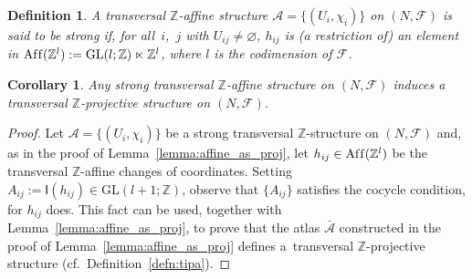 \documentclass[10pt,a4paper]{amsart}
\numberwithin{equation}{section}
\newtheorem{Corollary}[Theorem]{Corollary}
\newtheorem{Definition}[Theorem]{Definition}
\newcommand{\ZZ}{\mathbb{Z}}
\begin{document}
\begin{Definition}\label{defn:strong_Z_aff}
A transversal $\ZZ$-af\/f\/ine structure $\mathcal{A}=\{(U_i,\chi_i)\}$ on $(N,\mathcal{F})$ is said to be {\it strong} if, for all~$i$,~$j$ with $U_{ij} \neq \varnothing$, $h_{ij}$ is (a restriction of) an element in $\operatorname{Af\/f}(\ZZ^l):= \mathrm{GL}(l;\ZZ) \ltimes \ZZ^l$, where $l$ is the codimension of $\mathcal{F}$.
\end{Definition}

\begin{Corollary}\label{cor:strong_Z_proj}
Any strong transversal $\ZZ$-affine structure on $(N,\mathcal{F})$ induces a transversal $\ZZ$-projective structure on $(N,\mathcal{F})$.
\end{Corollary}
\begin{proof}
Let $\mathcal{A}=\{(U_i,\chi_i)\}$ be a strong transversal $\ZZ$-structure on $(N,\mathcal{F})$ and, as in the proof of Lemma~\ref{lemma:affine_as_proj}, let $h_{ij} \in \operatorname{Af\/f}(\ZZ^l)$ be the transversal $\ZZ$-af\/f\/ine changes of coordinates. Setting $A_{ij}:= \mathsf{I}(h_{ij}) \in \mathrm{GL}(l+1;\ZZ)$, observe that $\{A_{ij}\}$ satisf\/ies the cocycle condition, for $h_{ij}$ does. This fact can be used, together with Lemma~\ref{lemma:affine_as_proj}, to prove that the atlas $\bar{\mathcal{A}}$ constructed in the proof of Lemma~\ref{lemma:affine_as_proj} def\/ines a~transversal $\ZZ$-projective structure (cf.\ Def\/inition~\ref{defn:tipa}).
\end{proof}
\end{document}

